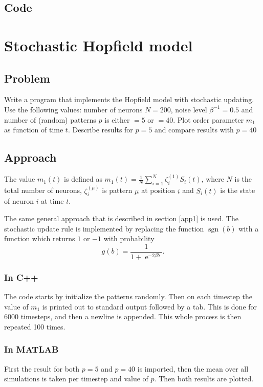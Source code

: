 \documentclass[12pt,a4paper]{article}
\begin{document}
\subsection{Code}

\section{Stochastic Hopfield model}
\subsection{Problem}
Write a program that implements the Hopfield model with stochastic updating.
Use the following values: number of neurons $N = 200$, noise level
$\beta^{-1} = 0.5$ and number of (random) patterns $p$ is either $=5$ or
$=40$. Plot order parameter $m_1$ as function of time $t$. Describe results for $p = 5$ and compare results with $p=40$

\subsection{Approach}
The value $m_1(t)$ is defined as $m_1(t) = \frac{1}{N} \sum_{i =1}^N
\zeta^{(1)}_i  S_i(t)$, where $N$ is the total number of neurons,
$\zeta^{(\mu)}_i$ is pattern $\mu$ at position $i$ and $S_i(t)$ is the state
of neuron $i$ at time $t$.

The same general approach that is described in section \ref{app1} is used. The stochastic update rule is implemented by replacing the function $\operatorname{sgn}(b)$ with a function which returns $1$ or $-1$ with probability
$$ g(b) = \frac{1}{1 + \operatorname{e}^{-2 \beta b}}. $$

\subsubsection{In C++}
The code starts by initialize the patterns randomly.
Then on each timestep the value of $m_1$ is printed out to standard output
followed by a tab. This is done for 6000 timesteps, and then a newline is
appended. This whole process is then repeated 100 times.

\subsubsection{In MATLAB}
First the result for both $p=5$ and $p=40$ is imported, then the mean over
all simulations is taken per timestep and value of $p$. Then both results are plotted.
\end{document}
